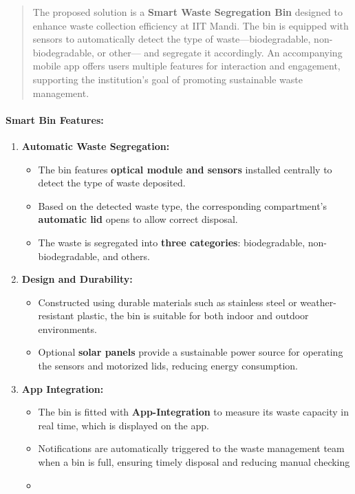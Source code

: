 \documentclass[
]{article}
\begin{document}
\begin{quote}
The proposed solution is a \textbf{Smart Waste Segregation Bin} designed
to enhance waste collection efficiency at IIT Mandi. The bin is equipped
with sensors to automatically detect the type of waste---biodegradable,
non-biodegradable, or other--- and segregate it accordingly. An
accompanying mobile app offers users multiple features for interaction
and engagement, supporting the institution's goal of promoting
sustainable waste management.
\end{quote}

\hypertarget{smart-bin-features}{%
\paragraph{\texorpdfstring{\textbf{Smart Bin
Features:}}{Smart Bin Features:}}\label{smart-bin-features}}

\begin{enumerate}
\def\labelenumi{\arabic{enumi}.}
\item
  \textbf{Automatic Waste Segregation:}

  \begin{itemize}
  \item
    The bin features \textbf{optical module and sensors} installed
    centrally to detect the type of waste deposited.
  \item
    Based on the detected waste type, the corresponding compartment's
    \textbf{automatic lid} opens to allow correct disposal.
  \item
    The waste is segregated into \textbf{three categories}:
    biodegradable, non-biodegradable, and others.
  \end{itemize}
\item
  \textbf{Design and Durability:}

  \begin{itemize}
  \item
    Constructed using durable materials such as stainless steel or
    weather-resistant plastic, the bin is suitable for both indoor and
    outdoor environments.
  \item
    Optional \textbf{solar panels} provide a sustainable power source
    for operating the sensors and motorized lids, reducing energy
    consumption.
  \end{itemize}
\item
  \textbf{App Integration:}

  \begin{itemize}
  \item
    The bin is fitted with \textbf{App-Integration} to measure its waste
    capacity in real time, which is displayed on the app.
  \item
    Notifications are automatically triggered to the waste management
    team when a bin is full, ensuring timely disposal and reducing
    manual checking
  \item
  \end{itemize}
\end{enumerate}
\end{document}
